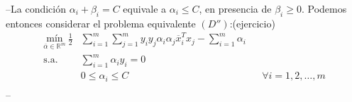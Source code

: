 \documentclass[11pt]{article}
\newcommand{\R}{\mathbb{R}}
\newcommand{\Rm}{\R^{m}}
\newcommand{\av}{\overline{\alpha}}
\newcommand{\x}{\overline{x}}
\newcommand{\Sm}{1,2,\ldots, m}
\newcommand{\ali}{\alpha_{i}}
\newcommand{\alj}{\alpha_{j}}
\newcommand{\bei}{\beta_{i}}
\begin{document}
--La condición $\ali+\bei=C$ equivale a $\ali\leq C$, en presencia de $\bei\geq0$. Podemos entonces considerar el problema equivalente $(D'')$:(ejercicio)
\begin{equation*}
\begin{aligned}
\underset{\av\in\Rm}{\text{mín}}\ \frac{1}{2}&\sum_{i=1}^{m}\sum_{j=1}^{m}y_{i}y_{j}\ali\alj\x_{i}^{T}x_{j}-\sum_{i=1}^{m}\ali \\
\text{s.a.}\ \
& \sum_{i=1}^{m}\ali y_{i}=0\\
& 0\leq\ali\leq C &&\forall i=\Sm\\
\end{aligned}
\end{equation*}
--
\end{document}

